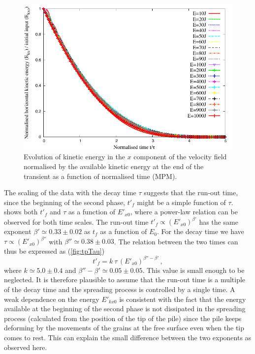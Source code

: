 \begin{figure}[tbhp]
\centering
\includegraphics[width=\textwidth]{EkxKoTTau_Slope}
\caption[Evolution of the normalised horizontal kinetic energy as function of 
the normalised time since the transient phase.]{Evolution of kinetic energy in 
the $x$ component of 
the velocity field  normalised by the available kinetic energy at the end of 
the transient as a function of normalised time (MPM).}
\label{fig:ExEx0_vs_ttau}
\end{figure}


The scaling of the data with the decay time $\tau$ suggests that the 
run-out time, since the beginning of the second phase, $t'_f$ might be a simple 
function of $\tau$.~ shows both $t'_f$ and $\tau$ as 
a function of $E'_{x0}$, where a power-law relation can be observed for both 
time scales. The run-out time $t'_f \propto (E'_{x0})^{\beta'}$ has the 
same exponent $\beta' \simeq 0.33 \pm 0.02$ as $t_f$ as a function of $E_0$. 
For the decay time we have $\tau \propto (E'_{x0})^{\beta''}$ with $\beta'' 
\simeq 0.38 \pm 0.03$. The relation between the two times can thus be expressed 
as (\cref{fig:tpTau})
\begin{equation}
t'_f = k  \ \tau \, (E'_{x0})^{\beta'' - \beta'} \,,
\label{eqn:t'f}
\end{equation}
where $k \simeq 5.0 \pm 0.4$ and $\beta'' - \beta' \simeq 0.05 \pm 0.05$. This 
value is small enough to be neglected. It is therefore plausible to assume that 
the run-out time is a multiple of the decay time and the spreading process is 
controlled by a single time. A weak dependence on the energy $E'_{kx0}$ is 
consistent with the fact that the energy available at the beginning of the 
second phase is not dissipated in the spreading process (calculated from the 
position of the tip of the pile) since the pile keeps deforming by the 
movements of the grains at the free surface even when the tip comes to rest. 
This can explain the small difference between the two exponents as observed 
here.


